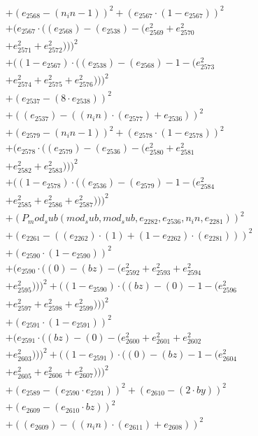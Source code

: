 \documentclass[10pt, a4paper]{article}
\begin{document}
\begin{align*}
& + (e_{2568} - (n_in - 1))^{2} + (e_{2567}  \cdot  (1 - e_{2567}))^{2} \\
& + (e_{2567}  \cdot  ((e_{2568}) - (e_{2538}) - (e_{2569}^{2} + e_{2570}^{2} \\
& + e_{2571}^{2} + e_{2572}^{2})))^{2} \\
& + ((1 - e_{2567})  \cdot  ((e_{2538}) - (e_{2568}) - 1 - (e_{2573}^{2} \\
& + e_{2574}^{2} + e_{2575}^{2} + e_{2576}^{2})))^{2} \\
& + (e_{2537} - (8  \cdot  e_{2538}))^{2} \\
& + ((e_{2537}) - ((n_in)  \cdot  (e_{2577}) + e_{2536}))^{2} \\
& + (e_{2579} - (n_in - 1))^{2} + (e_{2578}  \cdot  (1 - e_{2578}))^{2} \\
& + (e_{2578}  \cdot  ((e_{2579}) - (e_{2536}) - (e_{2580}^{2} + e_{2581}^{2} \\
& + e_{2582}^{2} + e_{2583}^{2})))^{2} \\
& + ((1 - e_{2578})  \cdot  ((e_{2536}) - (e_{2579}) - 1 - (e_{2584}^{2} \\
& + e_{2585}^{2} + e_{2586}^{2} + e_{2587}^{2})))^{2} \\
& + (P_mod_sub(mod_sub, mod_sub, e_{2282}, e_{2536}, n_in, e_{2281}))^{2} \\
& + (e_{2261} - ((e_{2262})  \cdot  (1) + (1 - e_{2262})  \cdot  (e_{2281})))^{2} \\
& + (e_{2590}  \cdot  (1 - e_{2590}))^{2} \\
& + (e_{2590}  \cdot  ((0) - (bz) - (e_{2592}^{2} + e_{2593}^{2} + e_{2594}^{2} \\
& + e_{2595}^{2})))^{2} + ((1 - e_{2590})  \cdot  ((bz) - (0) - 1 - (e_{2596}^{2} \\
& + e_{2597}^{2} + e_{2598}^{2} + e_{2599}^{2})))^{2} \\
& + (e_{2591}  \cdot  (1 - e_{2591}))^{2} \\
& + (e_{2591}  \cdot  ((bz) - (0) - (e_{2600}^{2} + e_{2601}^{2} + e_{2602}^{2} \\
& + e_{2603}^{2})))^{2} + ((1 - e_{2591})  \cdot  ((0) - (bz) - 1 - (e_{2604}^{2} \\
& + e_{2605}^{2} + e_{2606}^{2} + e_{2607}^{2})))^{2} \\
& + (e_{2589} - (e_{2590}  \cdot  e_{2591}))^{2} + (e_{2610} - (2  \cdot  by))^{2} \\
& + (e_{2609} - (e_{2610}  \cdot  bz))^{2} \\
& + ((e_{2609}) - ((n_in)  \cdot  (e_{2611}) + e_{2608}))^{2} \\

\end{align*}
\end{document}
